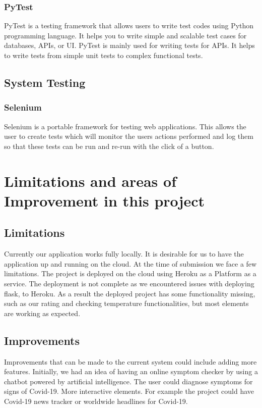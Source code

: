 \subsubsection{PyTest}
PyTest is a testing framework that allows users to write test codes using Python programming language. It helps you to write simple and scalable test cases for databases, APIs, or UI. PyTest is mainly used for writing tests for APIs. It helps to write tests from simple unit tests to complex functional tests.

\subsection{System Testing}

\subsubsection{Selenium}
Selenium is a portable framework for testing web applications. This allows the user to create tests which will monitor the users actions performed and log them so that these tests can be run and re-run with the click of a button.

\section{Limitations and areas of Improvement in this project}

\subsection{Limitations}
Currently our application works fully locally. It is desirable for us to have the application up and running on the cloud. At the time of submission we face a few limitations. The project is deployed on the cloud using Heroku as a Platform as a service. The deployment is not complete as we encountered issues with deploying flask, to Heroku. As a result the deployed project has some functionality missing, such as our rating and checking temperature functionalities, but most elements are working as expected.  



\subsection{Improvements}
Improvements that can be made to the current system could include adding more features. Initially, we had an idea of having an online symptom checker by using a chatbot powered by artificial intelligence. The user could diagnose symptoms for signs of Covid-19.
More interactive elements. For example the project could have Covid-19 news tracker or worldwide headlines for Covid-19.



